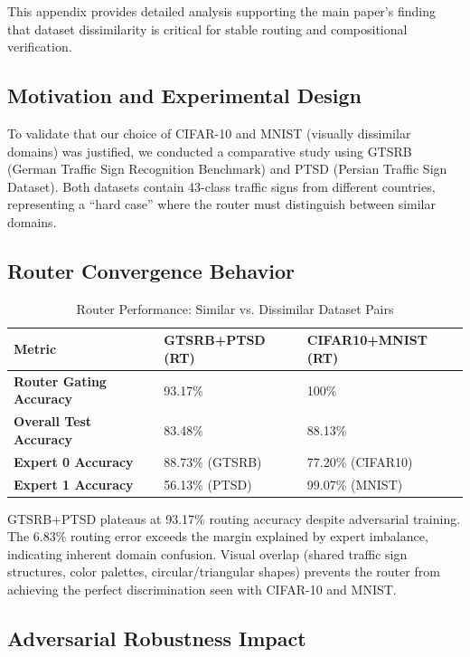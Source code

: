 \documentclass[11pt,a4paper]{article}
\begin{document}
This appendix provides detailed analysis supporting the main paper's finding that dataset dissimilarity is critical for stable routing and compositional verification.

\subsection{Motivation and Experimental Design}

To validate that our choice of CIFAR-10 and MNIST (visually dissimilar domains) was justified, we conducted a comparative study using GTSRB (German Traffic Sign Recognition Benchmark) and PTSD (Persian Traffic Sign Dataset). Both datasets contain 43-class traffic signs from different countries, representing a ``hard case'' where the router must distinguish between similar domains.

\subsection{Router Convergence Behavior}

\begin{table}[H]
\centering
\small
\begin{tabular}{lll}
\toprule
\textbf{Metric} & \textbf{GTSRB+PTSD (RT)} & \textbf{CIFAR10+MNIST (RT)} \\
\midrule
\textbf{Router Gating Accuracy} & 93.17\% & 100\% \\
\textbf{Overall Test Accuracy} & 83.48\% & 88.13\% \\
\textbf{Expert 0 Accuracy} & 88.73\% (GTSRB) & 77.20\% (CIFAR10) \\
\textbf{Expert 1 Accuracy} & 56.13\% (PTSD) & 99.07\% (MNIST) \\
\bottomrule
\end{tabular}
\caption{Router Performance: Similar vs. Dissimilar Dataset Pairs}
\end{table}

GTSRB+PTSD plateaus at 93.17\% routing accuracy despite adversarial training. The 6.83\% routing error exceeds the margin explained by expert imbalance, indicating inherent domain confusion. Visual overlap (shared traffic sign structures, color palettes, circular/triangular shapes) prevents the router from achieving the perfect discrimination seen with CIFAR-10 and MNIST.

\subsection{Adversarial Robustness Impact}
\end{document}
